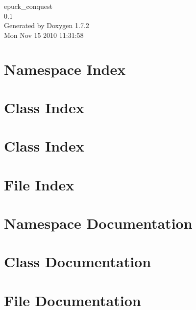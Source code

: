 \documentclass[a4paper]{book}
\begin{document}
\hypersetup{pageanchor=false}
\begin{titlepage}
\vspace*{7cm}
\begin{center}
{\Large epuck\_\-conquest \\[1ex]\large 0.1 }\\
\vspace*{1cm}
{\large Generated by Doxygen 1.7.2}\\
\vspace*{0.5cm}
{\small Mon Nov 15 2010 11:31:58}\\
\end{center}
\end{titlepage}
\clearemptydoublepage
{}
\tableofcontents
\clearemptydoublepage
{}
\hypersetup{pageanchor=true}
\chapter{Namespace Index}

\chapter{Class Index}

\chapter{Class Index}

\chapter{File Index}

\chapter{Namespace Documentation}




\chapter{Class Documentation}











\chapter{File Documentation}













\printindex
\end{document}
